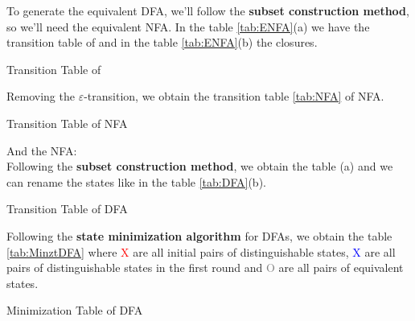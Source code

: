 To generate the equivalent DFA, we'll follow the \textbf{subset construction method},
so we'll need the equivalent NFA. In the table \ref{tab:ENFA}(a) we have the transition
table of \ENFA and in the table \ref{tab:ENFA}(b) the closures.

\begin{table}[h]
  \centering
  \caption{Transition Table of \ENFA}
  \label{tab:ENFA}
  \hspace{1cm}
\end{table}

\newpage
Removing the {\Large $\varepsilon$}-transition, we obtain the transition
table \ref{tab:NFA} of NFA.

\begin{table}[h!]
\centering
  \scalebox{0.6}{  }
  \caption{Transition Table of NFA}
  \label{tab:NFA}
\end{table}

And the NFA: \\


\newpage
Following the \textbf{subset construction method}, we obtain the table
(a) and we can rename the states like in the table \ref{tab:DFA}(b).

\begin{table}[h]
  \centering
  \caption{Transition Table of DFA}
  \label{tab:DFA}
  \hspace{1cm}
\end{table}

Following the \textbf{state minimization algorithm} for DFAs, we obtain the table \ref{tab:MinztDFA}
where {\small\textcolor{red}{X}} are all initial pairs of distinguishable states,
{\small\textcolor{blue}{X}} are all pairs of distinguishable states in the first round and
{\small\textcolor{gray}{O}} are all pairs of equivalent states.
\begin{table}[h!]
\centering
  \scalebox{0.9}{  }
  \caption{Minimization Table of DFA}
  \label{tab:MinztDFA}
\end{table}

